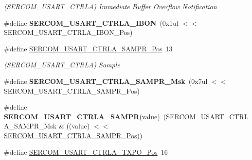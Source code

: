 \begin{DoxyCompactItemize}
\begin{DoxyCompactList}\small\item\em (S\+E\+R\+C\+O\+M\+\_\+\+U\+S\+A\+R\+T\+\_\+\+C\+T\+R\+L\+A) Immediate Buffer Overflow Notification \end{DoxyCompactList}\item 
\hypertarget{group___s_a_m_l21___s_e_r_c_o_m_gaf36387c9f3cf0434cbbe700eecf0eae2}{}\#define {\bfseries S\+E\+R\+C\+O\+M\+\_\+\+U\+S\+A\+R\+T\+\_\+\+C\+T\+R\+L\+A\+\_\+\+I\+B\+O\+N}~(0x1ul $<$$<$ S\+E\+R\+C\+O\+M\+\_\+\+U\+S\+A\+R\+T\+\_\+\+C\+T\+R\+L\+A\+\_\+\+I\+B\+O\+N\+\_\+\+Pos)\label{group___s_a_m_l21___s_e_r_c_o_m_gaf36387c9f3cf0434cbbe700eecf0eae2}

\item 
\hypertarget{group___s_a_m_l21___s_e_r_c_o_m_ga619783c40a8635d08e6d56e7ff43d5ea}{}\#define \hyperlink{group___s_a_m_l21___s_e_r_c_o_m_ga619783c40a8635d08e6d56e7ff43d5ea}{S\+E\+R\+C\+O\+M\+\_\+\+U\+S\+A\+R\+T\+\_\+\+C\+T\+R\+L\+A\+\_\+\+S\+A\+M\+P\+R\+\_\+\+Pos}~13\label{group___s_a_m_l21___s_e_r_c_o_m_ga619783c40a8635d08e6d56e7ff43d5ea}

\begin{DoxyCompactList}\small\item\em (S\+E\+R\+C\+O\+M\+\_\+\+U\+S\+A\+R\+T\+\_\+\+C\+T\+R\+L\+A) Sample \end{DoxyCompactList}\item 
\hypertarget{group___s_a_m_l21___s_e_r_c_o_m_gac4303fbfaa1c9498646622e62ec1192d}{}\#define {\bfseries S\+E\+R\+C\+O\+M\+\_\+\+U\+S\+A\+R\+T\+\_\+\+C\+T\+R\+L\+A\+\_\+\+S\+A\+M\+P\+R\+\_\+\+Msk}~(0x7ul $<$$<$ S\+E\+R\+C\+O\+M\+\_\+\+U\+S\+A\+R\+T\+\_\+\+C\+T\+R\+L\+A\+\_\+\+S\+A\+M\+P\+R\+\_\+\+Pos)\label{group___s_a_m_l21___s_e_r_c_o_m_gac4303fbfaa1c9498646622e62ec1192d}

\item 
\hypertarget{group___s_a_m_l21___s_e_r_c_o_m_ga8feb46e14b82e8adc922390f9b580fd1}{}\#define {\bfseries S\+E\+R\+C\+O\+M\+\_\+\+U\+S\+A\+R\+T\+\_\+\+C\+T\+R\+L\+A\+\_\+\+S\+A\+M\+P\+R}(value)~(S\+E\+R\+C\+O\+M\+\_\+\+U\+S\+A\+R\+T\+\_\+\+C\+T\+R\+L\+A\+\_\+\+S\+A\+M\+P\+R\+\_\+\+Msk \& ((value) $<$$<$ \hyperlink{group___s_a_m_l21___s_e_r_c_o_m_ga619783c40a8635d08e6d56e7ff43d5ea}{S\+E\+R\+C\+O\+M\+\_\+\+U\+S\+A\+R\+T\+\_\+\+C\+T\+R\+L\+A\+\_\+\+S\+A\+M\+P\+R\+\_\+\+Pos}))\label{group___s_a_m_l21___s_e_r_c_o_m_ga8feb46e14b82e8adc922390f9b580fd1}

\item 
\hypertarget{group___s_a_m_l21___s_e_r_c_o_m_gab23dcbcc6dedf8763535234e70e95360}{}\#define \hyperlink{group___s_a_m_l21___s_e_r_c_o_m_gab23dcbcc6dedf8763535234e70e95360}{S\+E\+R\+C\+O\+M\+\_\+\+U\+S\+A\+R\+T\+\_\+\+C\+T\+R\+L\+A\+\_\+\+T\+X\+P\+O\+\_\+\+Pos}~16\label{group___s_a_m_l21___s_e_r_c_o_m_gab23dcbcc6dedf8763535234e70e95360}


\end{DoxyCompactItemize}
